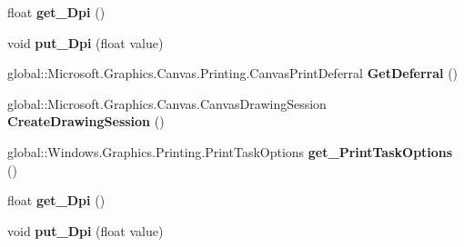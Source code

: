 \begin{DoxyCompactItemize}
float {\bfseries get\+\_\+\+Dpi} ()
\item 
\mbox{\label{interface_microsoft_1_1_graphics_1_1_canvas_1_1_printing_1_1_i_canvas_print_event_args_af46144e28207739e9392d369d6619b02}} 
void {\bfseries put\+\_\+\+Dpi} (float value)
\item 
\mbox{\label{interface_microsoft_1_1_graphics_1_1_canvas_1_1_printing_1_1_i_canvas_print_event_args_ab56989a826e9dc05d710c2959e2bb1a6}} 
global\+::\+Microsoft.\+Graphics.\+Canvas.\+Printing.\+Canvas\+Print\+Deferral {\bfseries Get\+Deferral} ()
\item 
\mbox{\label{interface_microsoft_1_1_graphics_1_1_canvas_1_1_printing_1_1_i_canvas_print_event_args_a638c3a913bba3112ce24903cdff62df6}} 
global\+::\+Microsoft.\+Graphics.\+Canvas.\+Canvas\+Drawing\+Session {\bfseries Create\+Drawing\+Session} ()
\item 
\mbox{\label{interface_microsoft_1_1_graphics_1_1_canvas_1_1_printing_1_1_i_canvas_print_event_args_a71ce18a370233ad4a96b04294e81d699}} 
global\+::\+Windows.\+Graphics.\+Printing.\+Print\+Task\+Options {\bfseries get\+\_\+\+Print\+Task\+Options} ()
\item 
\mbox{\label{interface_microsoft_1_1_graphics_1_1_canvas_1_1_printing_1_1_i_canvas_print_event_args_a904d227a056eff386ed0a743b040faad}} 
float {\bfseries get\+\_\+\+Dpi} ()
\item 
\mbox{\label{interface_microsoft_1_1_graphics_1_1_canvas_1_1_printing_1_1_i_canvas_print_event_args_af46144e28207739e9392d369d6619b02}} 
void {\bfseries put\+\_\+\+Dpi} (float value)
\item 
\mbox{\label{interface_microsoft_1_1_graphics_1_1_canvas_1_1_printing_1_1_i_canvas_print_event_args_ab56989a826e9dc05d710c2959e2bb1a6}} 

\end{DoxyCompactItemize}
